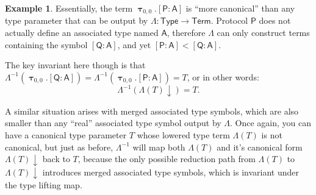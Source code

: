\documentclass[a4paper,headsepline,bibliography=totoc,toc=flat,fleqn,twoside=semi]{scrbook}
\theoremstyle{definition}
\theoremstyle{definition}
\newtheorem{example}{Example}[chapter]
\theoremstyle{definition}
\newcommand{\namesym}[1]{\mathsf{#1}}
\newcommand{\proto}[1]{\bm{\mathsf{#1}}}
\newcommand{\genericsym}[2]{\bm{\uptau}_{#1,#2}}
\newcommand{\assocsym}[2]{[\proto{#1}\colon\namesym{#2}]}
\begin{document}
\begin{example}
Essentially, the term $\genericsym{0}{0}.\assocsym{P}{A}$ is ``more canonical'' than any type parameter that can be output by $\Lambda:\namesym{Type}\rightarrow\namesym{Term}$. Protocol $\proto{P}$ does not actually define an associated type named $\namesym{A}$, therefore $\Lambda$ can only construct terms containing the symbol $\assocsym{Q}{A}$, and yet $\assocsym{P}{A}<\assocsym{Q}{A}$.

The key invariant here though is that $\Lambda^{-1}(\genericsym{0}{0}.\assocsym{Q}{A})=\Lambda^{-1}(\genericsym{0}{0}.\assocsym{P}{A})=T$, or in other words:
\[\Lambda^{-1}(\Lambda(T){\downarrow})=T.\]

A similar situation arises with merged associated type symbols, which are also smaller than any ``real'' associated type symbol output by $\Lambda$. Once again, you can have a canonical type parameter $T$ whose lowered type term $\Lambda(T)$ is not canonical, but just as before, $\Lambda^{-1}$ will map both $\Lambda(T)$ and it's canonical form $\Lambda(T){\downarrow}$ back to $T$, because the only possible reduction path from $\Lambda(T)$ to $\Lambda(T){\downarrow}$ introduces merged associated type symbols, which is invariant under the type lifting map.
\end{example}
\end{document}
